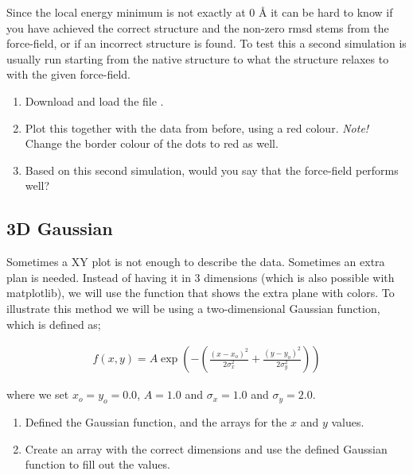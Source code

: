 \documentclass{article}
\begin{document}
Since the local energy minimum is not exactly at 0 Å it can be hard to know if you have achieved the correct structure and the non-zero rmsd stems from the force-field, or if an incorrect structure is found.
To test this a second simulation is usually run starting from the native structure to what the structure relaxes to with the given force-field.


\begin{enumerate}[resume]

    \item Download and load the file .

    \item Plot this together with the data from before, using a red colour. \emph{Note!} Change the border colour of the dots to red as well.

    \item Based on this second simulation, would you say that the force-field performs well?

\end{enumerate}


\newpage
\subsection{3D Gaussian}

Sometimes a XY plot is not enough to describe the data. Sometimes an extra plan is needed.
Instead of having it in 3 dimensions (which is also possible with matplotlib), we will use the  function that shows the extra plane with colors.
%
To illustrate this method we will be using a two-dimensional Gaussian function, which is defined as;

\begin{align}
  f(x,y) = A \exp \left ( - \left ( \frac{(x - x_o)^2}{2\sigma_x^2} + \frac{(y - y_o)^2}{2\sigma_y^2} \right ) \right )
\end{align}

where we set $x_o = y_o = 0.0$, $A = 1.0$ and $\sigma_x = 1.0$ and $\sigma_y = 2.0$.\\


\begin{enumerate}

    \item Defined the Gaussian function, and the arrays for the $x$ and $y$ values.

    \item Create an array  with the correct dimensions and use the defined Gaussian function to fill out the values.

\end{enumerate}
\end{document}
